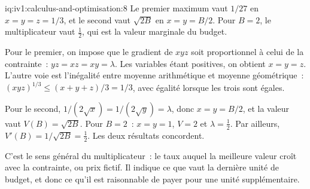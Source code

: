 \begin{solution}{iq:iv1:calculus-and-optimisation:8}
Le premier maximum vaut $1/27$ en $x = y = z = 1/3$, et le second vaut $\sqrt{2B}$ en $x = y = B/2$. Pour $B = 2$, le multiplicateur vaut $\frac12$, qui est la valeur marginale du budget.

Pour le premier, on impose que le gradient de $xyz$ soit proportionnel à celui de la contrainte~: $yz = xz = xy = \lambda$. Les variables étant positives, on obtient $x = y = z$. L'autre voie est l'inégalité entre moyenne arithmétique et moyenne géométrique~: $(xyz)^{1/3} \le (x + y + z)/3 = 1/3$, avec égalité lorsque les trois sont égales.

Pour le second, $1/(2\sqrt{x}) = 1/(2\sqrt{y}) = \lambda$, donc $x = y = B/2$, et la valeur vaut $V(B) = \sqrt{2B}$. Pour $B = 2$~: $x = y = 1$, $V = 2$ et $\lambda = \frac12$. Par ailleurs, $V'(B) = 1/\sqrt{2B} = \frac12$. Les deux résultats concordent.

C'est le sens général du multiplicateur~: le taux auquel la meilleure valeur croît avec la contrainte, ou prix fictif. Il indique ce que vaut la dernière unité de budget, et donc ce qu'il est raisonnable de payer pour une unité supplémentaire.



\end{solution}


